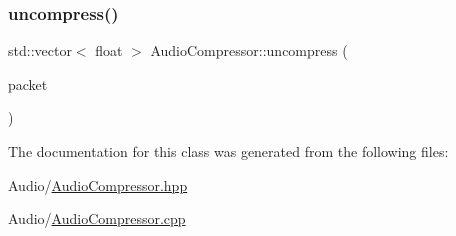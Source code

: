 \subsubsection{\texorpdfstring{uncompress()}{uncompress()}}
{\footnotesize\ttfamily std\+::vector$<$ float $>$ Audio\+Compressor\+::uncompress (\begin{DoxyParamCaption}\item[{const \mbox{\hyperlink{structAudioPacket}{Audio\+Packet}} \&}]{packet }\end{DoxyParamCaption})}



The documentation for this class was generated from the following files\+:\begin{DoxyCompactItemize}
\item 
Audio/\mbox{\hyperlink{AudioCompressor_8hpp}{Audio\+Compressor.\+hpp}}\item 
Audio/\mbox{\hyperlink{AudioCompressor_8cpp}{Audio\+Compressor.\+cpp}}\end{DoxyCompactItemize}
